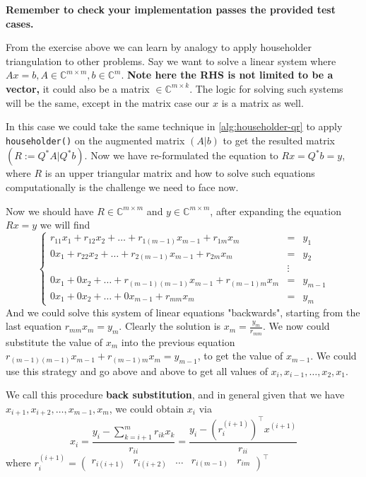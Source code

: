 \noindent \textbf{Remember to check your implementation passes the provided test cases.} 

\noindent From the exercise above we can learn by analogy to apply householder triangulation to other problems. Say we want to solve a linear system where \(Ax = b, A \in  \mathbb{C}^{m \times  m}, b \in \mathbb{C}^{m}\). \textbf{Note here the RHS is not limited to be a vector,} it could also be a matrix \(\in \mathbb{C}^{m \times k}\). The logic for solving such systems will be the same, except in the matrix case our $x$ is a matrix as well. \medskip

\noindent In this case we could take the same technique in \autoref{alg:householder-qr} to apply \texttt{householder()} on the augmented matrix $(A | b)$ to get the resulted matrix $(R := Q^{*}A | Q^{*}b)$. Now we have re-formulated the equation to $Rx = Q^{*}b = y$, where $R$ is an upper triangular matrix and how to solve such equations computationally is the challenge we need to face now. \medskip

\noindent Now we should have \(R \in \mathbb{C}^{m \times m}\) and \(y \in \mathbb{C}^{m \times  m}\), after expanding the equation $Rx = y$ we will find
\[
\left\{
  \begin{array}{rcl}
    r_{11}x_1 + r_{12}x_2 + \ldots + r_{1(m - 1)}x_{m - 1} + r_{1m}x_{m} & = & y_1 \\
    0x_1 + r_{22}x_2 + \ldots + r_{2(m - 1)}x_{m - 1} + r_{2m}x_m & = & y_2 \\
     & \vdots &  \\
    0x_1 + 0x_2 + \ldots + r_{(m - 1)(m - 1)}x_{m - 1} + r_{(m - 1)m}x_{m} & = & y_{m - 1} \\
    0x_1 + 0x_2 + \ldots + 0x_{m - 1} + r_{mm}x_{m} & = & y_{m}
  \end{array}
\right.
\]
And we could solve this system of linear equations "backwards", starting from the last equation $r_{mm}x_{m} = y_{m}$. Clearly the solution is $x_{m} = \frac{y_{m}}{r_{mm}}$. We now could substitute the value of $x_{m}$ into the previous equation $r_{(m - 1)(m - 1)}x_{m - 1} + r_{(m - 1)m}x_{m} = y_{m - 1}$, to get the value of $x_{m - 1}$. We could use this strategy and go above and above to get all values of $x_{i}, x_{i - 1}, \ldots, x_{2}, x_1$. \medskip

\noindent We call this procedure \textbf{back substitution}, and in general given that we have $x_{i + 1}, x_{i + 2}, \ldots, x_{m - 1}, x_{m}$, we could obtain $x_{i}$ via
\[
x_{i} = \frac{y_{i} - \sum_{k=i + 1}^{m} r_{ik}x_{k}}{r_{ii}} = \frac{y_{i} - (r_{i}^{(i + 1)})^{\top} x^{(i + 1)}}{r_{ii}}
\] 
where $r_{i}^{(i + 1)} = \begin{pmatrix} r_{i(i + 1)} & r_{i(i + 2)} & \ldots & r_{i(m - 1)} & r_{im} \end{pmatrix} ^{\top}$ 

